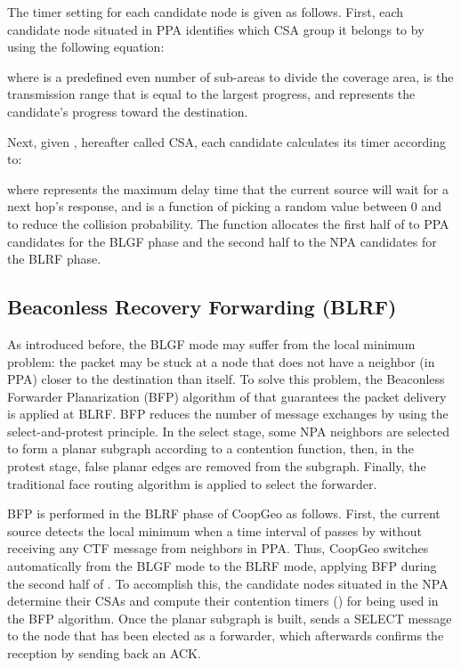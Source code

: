 \documentclass[journal,twoside,final]{IEEEtran}
\begin{document}
The timer setting for each candidate node is given as follows. First, each candidate node situated in PPA identifies which CSA group it belongs to by using the following equation:

where  is a predefined even number of sub-areas to divide the coverage area,  is the transmission range that is equal to the largest progress, and  represents the candidate's progress toward the destination.

Next, given , hereafter called CSA, each candidate calculates its  timer according to:

where  represents the maximum delay time that the current source  will wait for a next hop's response, and  is a function of picking a random value between 0 and  to reduce the collision probability. The  function allocates the first half of  to PPA candidates for the BLGF phase and the second half to the NPA candidates for the BLRF phase.

\subsection{Beaconless Recovery Forwarding (BLRF)}
As introduced before, the BLGF mode may suffer from the local minimum problem: the packet may be stuck at a node that does not have a neighbor (in PPA) closer to the destination than itself. To solve this problem, the Beaconless Forwarder Planarization (BFP) algorithm of \cite{Kalosha2008} that guarantees the packet delivery is applied at BLRF. BFP reduces the number of message exchanges by using the select-and-protest principle. In the select stage, some NPA neighbors are selected to form a planar subgraph according to a contention function, then, in the protest stage, false planar edges are removed from the subgraph. Finally, the traditional face routing algorithm is applied to select the forwarder.

BFP is performed in the BLRF phase of CoopGeo as follows. First, the current source detects the local minimum when a time interval of  passes by without receiving any CTF message from neighbors in PPA. Thus, CoopGeo switches automatically from the BLGF mode to the BLRF mode, applying BFP during the second half of . To accomplish this, the candidate nodes situated in the NPA determine their CSAs and compute their contention timers () for being used in the BFP algorithm. Once the planar subgraph is built,  sends a SELECT message to the node that has been elected as a forwarder, which afterwards confirms the reception by sending back an ACK.
\end{document}
